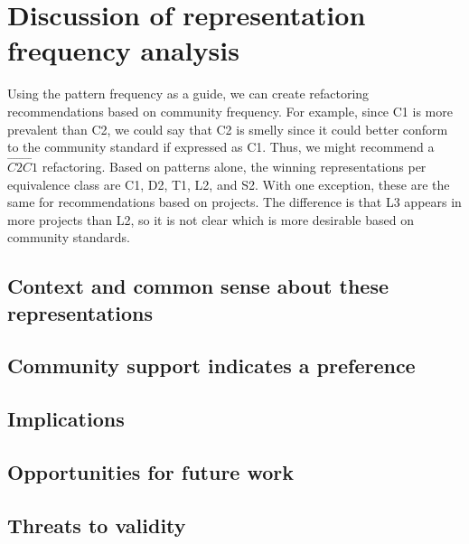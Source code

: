 \section{Discussion of representation frequency analysis}

Using the pattern frequency as a guide, we can create refactoring recommendations based on community frequency. For example, since C1 is more prevalent than C2, we could say that C2 is smelly since it could better conform to the community standard if expressed as C1. Thus, we might recommend a $\overrightarrow{C2C1}$ refactoring. Based on patterns alone, the winning representations per equivalence class are C1, D2, T1, L2, and S2. With one exception, these are the same for recommendations based on projects. The difference is that L3 appears in more projects than L2, so it is not clear which is more desirable based on community standards.
\subsection{Context and common sense about these representations}
\subsection{Community support indicates a preference}
\subsection{Implications}
\subsection{Opportunities for future work}
\subsection{Threats to validity}
